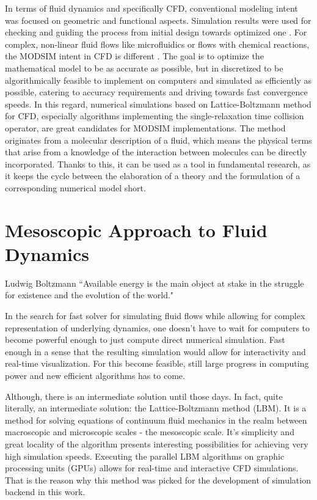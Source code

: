 In terms of fluid dynamics and specifically CFD, conventional modeling intent was focused on geometric and functional aspects. Simulation results were used for checking and guiding the process from initial design towards optimized one  \citep{liAssociationDesignSimulation2016}. For complex, non-linear fluid flows like microfluidics or flows with chemical reactions, the MODSIM intent in CFD is different \citep{zhangLatticeBoltzmannMethod2011}. The goal is to optimize the mathematical model to be as accurate as possible, but in discretized to be algorithmically feasible to implement on computers and simulated as efficiently as possible, catering to accuracy requirements and driving towards fast convergence speeds. In this regard, numerical simulations based on Lattice-Boltzmann method for CFD, especially algorithms implementing the single-relaxation time collision operator, are great candidates for MODSIM implementations. The method originates from a molecular description of a fluid, which means the physical terms that arise from a knowledge of the interaction between molecules can be directly incorporated. Thanks to this, it can be used as a tool in fundamental research, as it keeps the cycle between the elaboration of a theory and the formulation of a corresponding numerical model short.


\section{Mesoscopic Approach to Fluid Dynamics}\label{sec:meso}
\begin{chapquote}{Ludwig Boltzmann}
	``Available energy is the main object at stake in the struggle for existence and the evolution of the world."
\end{chapquote}

In the search for fast solver for simulating fluid flows while allowing for complex representation of underlying dynamics, one doesn't have to wait for computers to become powerful enough to just compute direct numerical simulation. Fast enough in a sense that the resulting simulation would allow for interactivity and real-time visualization. For this become feasible, still large progress in computing power and new efficient algorithms has to come.

Although, there is an intermediate solution until those days. In fact, quite literally, an intermediate solution: the Lattice-Boltzmann method (LBM). It is a method for solving equations of continuum fluid mechanics in the realm between macroscopic and microscopic scales - the mesoscopic scale. It's simplicity and great locality of the algorithm presents interesting possibilities for achieving very high simulation speeds. Executing the parallel LBM algorithms on graphic processing units (GPUs) allows for real-time and interactive CFD simulations. That is the reason why this method was picked for the development of simulation backend in this work.

